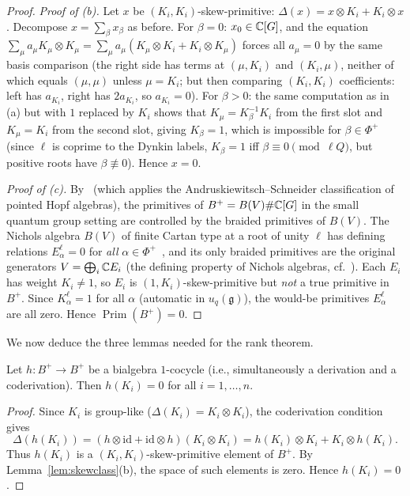 \begin{proof}
\emph{Proof of (b).} Let $x$ be $(K_i, K_i)$-skew-primitive: $\Delta(x) = x \otimes K_i + K_i \otimes x$. Decompose $x = \sum_\beta x_\beta$ as before. For $\beta = 0$: $x_0 \in \mathbb{C}[G]$, and the equation $\sum_\mu a_\mu K_\mu \otimes K_\mu = \sum_\mu a_\mu (K_\mu \otimes K_i + K_i \otimes K_\mu)$ forces all $a_\mu = 0$ by the same basis comparison (the right side has terms at $(\mu, K_i)$ and $(K_i, \mu)$, neither of which equals $(\mu, \mu)$ unless $\mu = K_i$; but then comparing $(K_i, K_i)$ coefficients: left has $a_{K_i}$, right has $2 a_{K_i}$, so $a_{K_i} = 0$). For $\beta > 0$: the same computation as in (a) but with $1$ replaced by $K_i$ shows that $K_\mu = K_\beta^{-1} K_i$ from the first slot and $K_\mu = K_i$ from the second slot, giving $K_\beta = 1$, which is impossible for $\beta \in \Phi^+$ (since $\ell$ is coprime to the Dynkin labels, $K_\beta = 1$ iff $\beta \equiv 0 \pmod{\ell Q}$, but positive roots have $\beta \not\equiv 0$). Hence $x = 0$.

\emph{Proof of (c).} By~\cite[Lemma 5.0.17(ii)]{MW08} (which applies the Andruskiewitsch--Schneider classification of pointed Hopf algebras), the primitives of $B^+ = B(V) \# \mathbb{C}[G]$ in the small quantum group setting are controlled by the braided primitives of $B(V)$. The Nichols algebra $B(V)$ of finite Cartan type at a root of unity $\ell$ has defining relations $E_\alpha^\ell = 0$ for \emph{all} $\alpha \in \Phi^+$~\cite[Thm 5.25]{Ang08}, and its only braided primitives are the original generators $V = \bigoplus_i \mathbb{C} E_i$ (the defining property of Nichols algebras, cf.~\cite[\S 2.4]{AKM15}). Each $E_i$ has weight $K_i \neq 1$, so $E_i$ is $(1, K_i)$-skew-primitive but \emph{not} a true primitive in $B^+$. Since $K_\alpha^\ell = 1$ for all $\alpha$ (automatic in $u_q(\mathfrak{g})$), the would-be primitives $E_\alpha^\ell$ are all zero. Hence $\operatorname{Prim}(B^+) = 0$.
\end{proof}

We now deduce the three lemmas needed for the rank theorem.

\begin{lemma}
\label{lem:cartanvanish}
Let $h \colon B^+ \to B^+$ be a bialgebra $1$-cocycle (i.e., simultaneously a derivation and a coderivation). Then $h(K_i) = 0$ for all $i = 1, \ldots, n$.
\end{lemma}

\begin{proof}
Since $K_i$ is group-like ($\Delta(K_i) = K_i \otimes K_i$), the coderivation condition gives
\[
\Delta(h(K_i)) = (h \otimes \mathrm{id} + \mathrm{id} \otimes h)(K_i \otimes K_i) = h(K_i) \otimes K_i + K_i \otimes h(K_i).
\]
Thus $h(K_i)$ is a $(K_i, K_i)$-skew-primitive element of $B^+$. By Lemma~\ref{lem:skewclass}(b), the space of such elements is zero. Hence $h(K_i) = 0$.
\end{proof}

